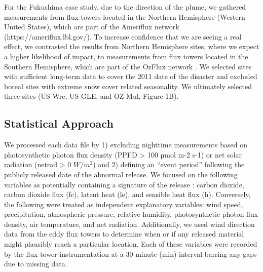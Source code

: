 \documentclass{article}
\begin{document}
For the Fukushima case study, due to the direction of the plume, we gathered measurements from flux towers located in the Northern Hemisphere (Western United States), which are part of the Ameriflux network (https://ameriflux.lbl.gov/). To increase confidence that we are seeing a real effect, we contrasted the results from Northern Hemisphere sites, where we expect a higher likelihood of impact, to measurements from flux towers located in the Southern Hemisphere, which are part of the OzFlux network \citep{cleverly2011alice}. We selected sites with sufficient long-term data to cover the 2011 date of the disaster and excluded boreal sites with extreme snow cover related seasonality. We ultimately selected three sites (US-Wrc, US-GLE, and OZ-Mul, Figure 1B).

\subsection{Statistical Approach}
We processed each data file by 1) excluding nighttime measurements based on photosynthetic photon flux density (PPFD > 100 µmol m-2 s-1) or net solar radiation (netrad > 0 $W/m^2$) and 2) defining an “event period” following the publicly released date of the abnormal release. We focused on the following variables as potentially containing a signature of the release : carbon dioxide, carbon dioxide flux (fc), latent heat (le), and sensible heat flux (h). Conversely, the following were treated as independent explanatory variables: wind speed, precipitation, atmospheric pressure, relative humidity, photosynthetic photon flux density, air temperature, and net radiation. Additionally, we used wind direction data from the eddy flux towers to determine when or if any released material might plausibly reach a particular location. Each of these variables were recorded by the flux tower instrumentation at a 30 minute (min) interval barring any gaps due to missing data.
\end{document}
